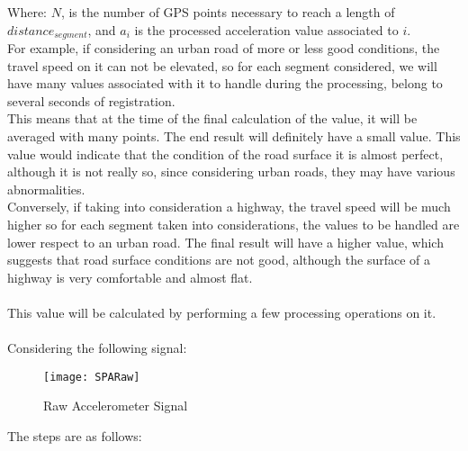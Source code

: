 \documentclass[tesi]{subfiles}
\begin{document}
\noindent Where: $N$, is the number of GPS points necessary to reach a length of $distance_{segment}$, and $a_{i}$ is the processed acceleration value associated to $i$.\\


\noindent For example, if considering an urban road of more or less good conditions, the travel speed on it can not be elevated, so for each segment considered, we will have many values associated with it to handle during the processing, belong to several seconds of registration.\\
\noindent This means that at the time of the final calculation of the value, it will be averaged with many points. The end result will definitely have a small value. This value would indicate that the condition of the road surface it is almost perfect, although it is not really so, since considering urban roads, they may have various abnormalities.\\
\noindent Conversely, if taking into consideration a highway, the travel speed will be much higher so for each segment taken into considerations, the values to be handled are lower respect to an urban road. The final result will have a higher value, which suggests that road surface conditions are not good, although the surface of a highway is very comfortable and almost flat.\\\\
\noindent This value will be calculated by performing a few processing operations on it.\\\\


\noindent Considering the following signal:
\begin{figure}[H]
\centering
\texttt{[image: SPARaw]}
\caption{Raw Accelerometer Signal}
\end{figure}

\noindent The steps are as follows:
\end{document}
